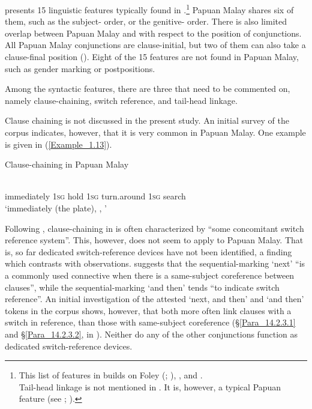 { presents 15 linguistic features typically found in  \citep[10]{Klamer.2010}.\footnote{This list of features in \citet{Klamer.2010} builds on Foley (\citeyear*{Foley.1986}; \citeyear*{Foley.2000}), \citet{Pawley.2005b}, and \cite{Aikhenvald.2007b}.\\
Tail-head linkage is not mentioned in \citet{Klamer.2008}. It is, however, a typical Papuan feature (see \citealt[200–201]{Foley.1986}; \citeyear*[390]{Foley.2000}).}
 Papuan Malay shares six of them, such as the subject- order, or the genitive- order. There is also limited overlap between Papuan Malay and  with respect to the position of conjunctions. All Papuan Malay conjunctions are clause-initial, but two of them can also take a clause-final position (). Eight of the 15 features are not found in Papuan Malay, such as gender marking or postpositions.

Among the syntactic features, there are three that need to be commented on, namely clause-chaining, switch reference, and tail-head linkage.



Clause chaining is not discussed in the present study. An initial survey of the corpus indicates, however, that it is very common in Papuan Malay. One example is given in (\ref{Example_1.13}).



\begin{styleExampleTitle}
{Clause-chaining in Papuan Malay}\label{Clause_chaining}
\end{styleExampleTitle}
\ea
\label{Example_1.13}
 {} {} {} {} {} {}\\ %
  immediately \textsc{1sg} hold \textsc{1sg} turn.around \textsc{1sg}  search\\

\glt 
‘immediately  (the plate), , ’ \textstyleExampleSource{[081011-005-Cv.0034]}
\z


Following \citet[11]{Klamer.2010}, clause-chaining in  is often characterized by  ``some concomitant switch reference system''. This, however, does not seem to apply to Papuan Malay. That is, so far dedicated switch-reference devices have not been identified, a finding which contrasts with  observations. \citet[431–432]{Donohue.2011} suggests that the sequential-marking   ‘next’  ``is a commonly used connective when there is a same-subject coreference  between clauses'', while the sequential-marking   ‘and then’ tends  ``to indicate switch reference''. An initial investigation of the attested  ‘next, and then’ and  ‘and then’ tokens in the corpus shows, however, that both  more often link clauses with a switch in reference, than those with same-subject coreference (§\ref{Para_14.2.3.1} and §\ref{Para_14.2.3.2}, in ). Neither do any of the other conjunctions function as dedicated switch-reference devices.

}
